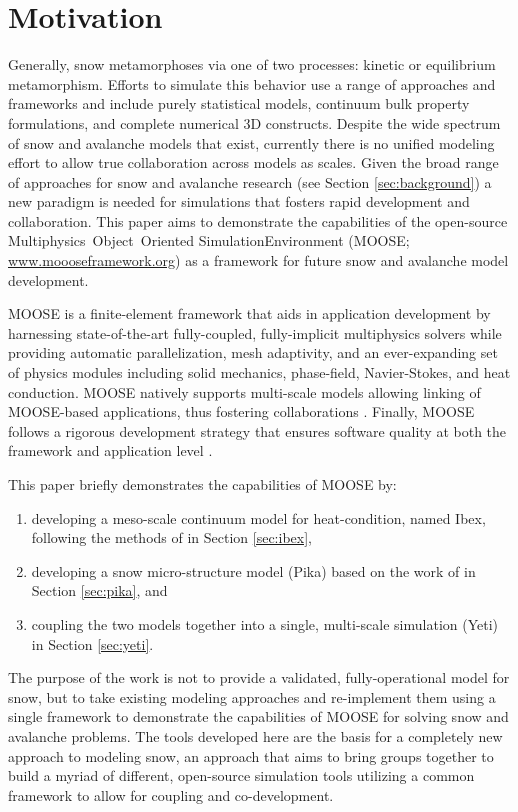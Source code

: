 \section{Motivation}\label{sec:motivation}
Generally, snow metamorphoses via one of two processes: kinetic or equilibrium metamorphism. Efforts to simulate this behavior use a range of approaches and frameworks and include purely statistical models, continuum bulk property formulations, and complete numerical 3D constructs. Despite the wide spectrum of snow and avalanche models that exist, currently there is no unified modeling effort to allow true collaboration across models as scales. Given the broad range of approaches for snow and avalanche research (see Section \ref{sec:background}) a new paradigm is needed for simulations that fosters rapid development and collaboration. This paper aims to demonstrate the capabilities of the open-source Multiphysics\, Object\, Oriented Simulation\authorcorrespond \noindent Environment (MOOSE; \url{www.moooseframework.org})  as a framework for future snow and avalanche model development.

MOOSE is a finite-element framework that aids in application development by harnessing state-of-the-art fully-coupled, fully-implicit multiphysics solvers while providing automatic parallelization, mesh adaptivity, and an ever-expanding set of physics modules including solid mechanics, phase-field, Navier-Stokes, and heat conduction. MOOSE natively supports multi-scale models allowing linking of MOOSE-based applications, thus fostering collaborations \citep{gaston2014physics}. Finally, MOOSE follows a rigorous development strategy that ensures software quality at both the framework and application level \citep{gaston2014continous}.

This paper briefly demonstrates the capabilities of MOOSE by:
\begin{enumerate}\setlength{\itemsep}{0pt}
\item developing a meso-scale continuum model for heat-condition, named Ibex, following the methods of \citet{slaughter2010numerical} in Section \ref{sec:ibex},
\item developing a snow micro-structure model (Pika) based on the work of \citet{kaempfer2009phase} in Section \ref{sec:pika}, and
\item coupling the two models together into a single, multi-scale simulation (Yeti) in Section \ref{sec:yeti}.
\end{enumerate}

The purpose of the work is not to provide a validated, fully-operational model for snow, but to take existing modeling approaches and re-implement them using a single framework to demonstrate the capabilities of MOOSE for solving snow and avalanche problems. The tools developed here are the basis for a completely new approach to modeling snow, an approach that aims to bring groups together to build a myriad of different, open-source simulation tools utilizing a common framework to allow for coupling and co-development.


